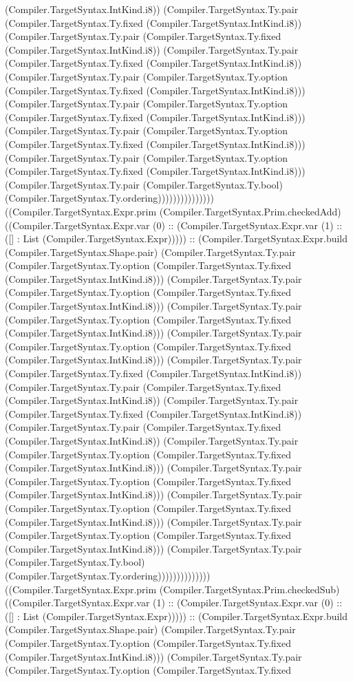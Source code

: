 \documentclass[11pt]{article}
\begin{document}
(Compiler.TargetSyntax.IntKind.i8)) (Compiler.TargetSyntax.Ty.pair (Compiler.TargetSyntax.Ty.fixed (Compiler.TargetSyntax.IntKind.i8)) (Compiler.TargetSyntax.Ty.pair (Compiler.TargetSyntax.Ty.fixed (Compiler.TargetSyntax.IntKind.i8)) (Compiler.TargetSyntax.Ty.pair (Compiler.TargetSyntax.Ty.fixed (Compiler.TargetSyntax.IntKind.i8)) (Compiler.TargetSyntax.Ty.pair (Compiler.TargetSyntax.Ty.option (Compiler.TargetSyntax.Ty.fixed (Compiler.TargetSyntax.IntKind.i8))) (Compiler.TargetSyntax.Ty.pair (Compiler.TargetSyntax.Ty.option (Compiler.TargetSyntax.Ty.fixed (Compiler.TargetSyntax.IntKind.i8))) (Compiler.TargetSyntax.Ty.pair (Compiler.TargetSyntax.Ty.option (Compiler.TargetSyntax.Ty.fixed (Compiler.TargetSyntax.IntKind.i8))) (Compiler.TargetSyntax.Ty.pair (Compiler.TargetSyntax.Ty.option (Compiler.TargetSyntax.Ty.fixed (Compiler.TargetSyntax.IntKind.i8))) (Compiler.TargetSyntax.Ty.pair (Compiler.TargetSyntax.Ty.bool) (Compiler.TargetSyntax.Ty.ordering))))))))))))))) ((Compiler.TargetSyntax.Expr.prim (Compiler.TargetSyntax.Prim.checkedAdd) ((Compiler.TargetSyntax.Expr.var (0) :: (Compiler.TargetSyntax.Expr.var (1) :: ([] : List (Compiler.TargetSyntax.Expr))))) :: (Compiler.TargetSyntax.Expr.build (Compiler.TargetSyntax.Shape.pair) (Compiler.TargetSyntax.Ty.pair (Compiler.TargetSyntax.Ty.option (Compiler.TargetSyntax.Ty.fixed (Compiler.TargetSyntax.IntKind.i8))) (Compiler.TargetSyntax.Ty.pair (Compiler.TargetSyntax.Ty.option (Compiler.TargetSyntax.Ty.fixed (Compiler.TargetSyntax.IntKind.i8))) (Compiler.TargetSyntax.Ty.pair (Compiler.TargetSyntax.Ty.option (Compiler.TargetSyntax.Ty.fixed (Compiler.TargetSyntax.IntKind.i8))) (Compiler.TargetSyntax.Ty.pair (Compiler.TargetSyntax.Ty.option (Compiler.TargetSyntax.Ty.fixed (Compiler.TargetSyntax.IntKind.i8))) (Compiler.TargetSyntax.Ty.pair (Compiler.TargetSyntax.Ty.fixed (Compiler.TargetSyntax.IntKind.i8)) (Compiler.TargetSyntax.Ty.pair (Compiler.TargetSyntax.Ty.fixed (Compiler.TargetSyntax.IntKind.i8)) (Compiler.TargetSyntax.Ty.pair (Compiler.TargetSyntax.Ty.fixed (Compiler.TargetSyntax.IntKind.i8)) (Compiler.TargetSyntax.Ty.pair (Compiler.TargetSyntax.Ty.fixed (Compiler.TargetSyntax.IntKind.i8)) (Compiler.TargetSyntax.Ty.pair (Compiler.TargetSyntax.Ty.option (Compiler.TargetSyntax.Ty.fixed (Compiler.TargetSyntax.IntKind.i8))) (Compiler.TargetSyntax.Ty.pair (Compiler.TargetSyntax.Ty.option (Compiler.TargetSyntax.Ty.fixed (Compiler.TargetSyntax.IntKind.i8))) (Compiler.TargetSyntax.Ty.pair (Compiler.TargetSyntax.Ty.option (Compiler.TargetSyntax.Ty.fixed (Compiler.TargetSyntax.IntKind.i8))) (Compiler.TargetSyntax.Ty.pair (Compiler.TargetSyntax.Ty.option (Compiler.TargetSyntax.Ty.fixed (Compiler.TargetSyntax.IntKind.i8))) (Compiler.TargetSyntax.Ty.pair (Compiler.TargetSyntax.Ty.bool) (Compiler.TargetSyntax.Ty.ordering)))))))))))))) ((Compiler.TargetSyntax.Expr.prim (Compiler.TargetSyntax.Prim.checkedSub) ((Compiler.TargetSyntax.Expr.var (1) :: (Compiler.TargetSyntax.Expr.var (0) :: ([] : List (Compiler.TargetSyntax.Expr))))) :: (Compiler.TargetSyntax.Expr.build (Compiler.TargetSyntax.Shape.pair) (Compiler.TargetSyntax.Ty.pair (Compiler.TargetSyntax.Ty.option (Compiler.TargetSyntax.Ty.fixed (Compiler.TargetSyntax.IntKind.i8))) (Compiler.TargetSyntax.Ty.pair (Compiler.TargetSyntax.Ty.option (Compiler.TargetSyntax.Ty.fixed 
\end{document}
